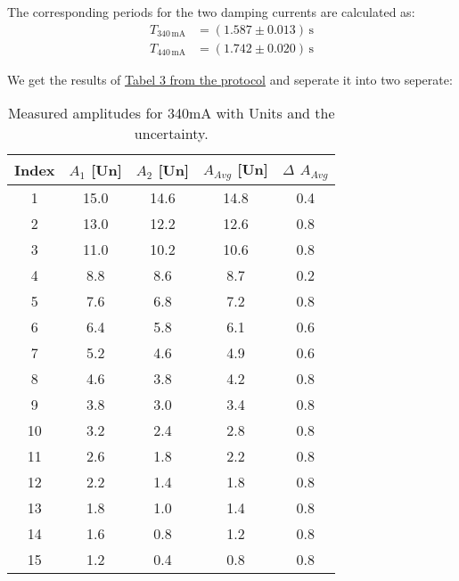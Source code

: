 The corresponding periods for the two damping currents are calculated as:
\begin{equation}
    \boxed{
        \begin{aligned}
        T_{340\,\mathrm{mA}} &= (1.587 \pm 0.013)\,\mathrm{s} \\
        T_{440\,\mathrm{mA}} &= (1.742 \pm 0.020)\,\mathrm{s}
    \end{aligned}
    }
\end{equation}


We get the results of \hyperref[protocol]{Tabel 3 from the protocol} and seperate it into two seperate: 
\begin{table}[h!]
    \centering
    \begin{tabular}{c|ccc|c}
        \hline
        \textbf{Index} & \textbf{$A_1$ [Un]} & \textbf{$A_2$ [Un]} & \textbf{$A_{Avg}$ [Un]} & \boldmath$\Delta$ \textbf{$A_{Avg}$} \\
        \hline
        1  & 15.0 & 14.6 & 14.8 & 0.4 \\
        2  & 13.0 & 12.2 & 12.6 & 0.8 \\
        3  & 11.0 & 10.2 & 10.6 & 0.8 \\
        4  & 8.8  & 8.6  & 8.7  & 0.2 \\
        5  & 7.6  & 6.8  & 7.2  & 0.8 \\
        6  & 6.4  & 5.8  & 6.1  & 0.6 \\
        7  & 5.2  & 4.6  & 4.9  & 0.6 \\
        8  & 4.6  & 3.8  & 4.2  & 0.8 \\
        9  & 3.8  & 3.0  & 3.4  & 0.8 \\
        10 & 3.2  & 2.4  & 2.8  & 0.8 \\
        11 & 2.6  & 1.8  & 2.2  & 0.8 \\
        12 & 2.2  & 1.4  & 1.8  & 0.8 \\
        13 & 1.8  & 1.0  & 1.4  & 0.8 \\
        14 & 1.6  & 0.8  & 1.2  & 0.8 \\
        15 & 1.2  & 0.4  & 0.8  & 0.8 \\
        \hline
    \end{tabular}
    \caption{Measured amplitudes for 340mA with Units and the uncertainty.}
    \label{tab:340mA}
\end{table}

